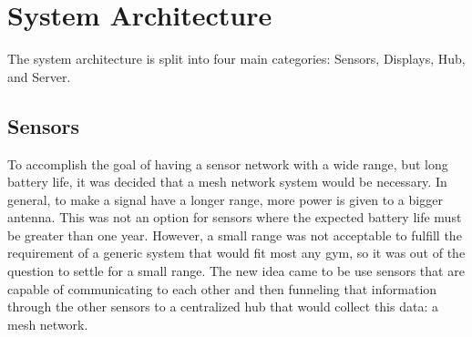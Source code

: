 \documentclass[PPFS.tex]{template/subfiles}
\begin{document}
\begin{comment}
    ----- Problem Statement -----
    It is helpful to provide a very simple block diagram of your project very early in the report to provide a
    graphical view that helps the reader understand. This diagram should focus on the interface(s) to your
    project. You may even show your project as a single block. This diagram can be more stylized (perhaps
    with clip art) to get the main idea across to the reader.

    When you get to sections that explain your design process, start with the design of the system
    architecture. This is where you provide a detailed block diagram of your system. Be sure to justify your
    approach. Why did you break down the functionality of the system into the blocks as you did? Were
    there alternative ways to do it?

    In many cases, you may also include a block diagram of the hardware and a separate block diagram of the
    software (and perhaps a system block diagram to show how the two relate). Many teams make the
    mistake of describing the software with very little detail. It is highly recommended that you include a
    block diagram of your software, preferably using the Uniform Modeling Language (UML).
\end{comment}

\section{System Architecture}

The system architecture is split into four main categories: Sensors, Displays, Hub, and Server.

\subsection{Sensors}

To accomplish the goal of having a sensor network with a wide range, but long battery life, it was decided that a mesh network system would be necessary. In general, to make a signal have a longer range, more power is given to a bigger antenna. This was not an option for sensors where the expected battery life must be greater than one year. However, a small range was not acceptable to fulfill the requirement of a generic system that would fit most any gym, so it was out of the question to settle for a small range. The new idea came to be use sensors that are capable of communicating to each other and then funneling that information through the other sensors to a centralized hub that would collect this data: a mesh network.
\end{document}
